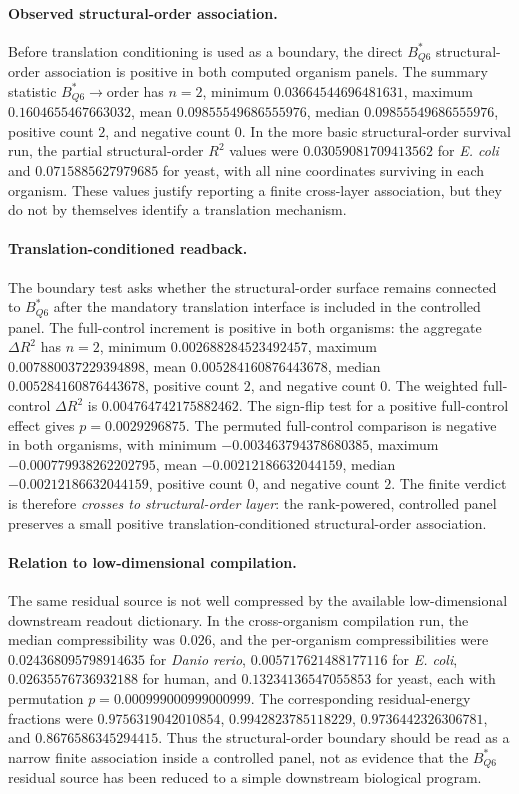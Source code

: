 \paragraph{Observed structural-order association.}
Before translation conditioning is used as a boundary, the direct $B^{\ast}_{Q6}$ structural-order association is positive in both computed organism panels.  The summary statistic $B^{\ast}_{Q6}\to\mathrm{order}$ has $n=2$, minimum $0.03664544696481631$, maximum $0.1604655467663032$, mean $0.09855549686555976$, median $0.09855549686555976$, positive count $2$, and negative count $0$.  In the more basic structural-order survival run, the partial structural-order $R^2$ values were $0.03059081709413562$ for \textit{E. coli} and $0.0715885627979685$ for yeast, with all nine coordinates surviving in each organism.  These values justify reporting a finite cross-layer association, but they do not by themselves identify a translation mechanism.

\paragraph{Translation-conditioned readback.}
The boundary test asks whether the structural-order surface remains connected to $B^{\ast}_{Q6}$ after the mandatory translation interface is included in the controlled panel.  The full-control increment is positive in both organisms: the aggregate $\Delta R^2$ has $n=2$, minimum $0.002688284523492457$, maximum $0.007880037229394898$, mean $0.005284160876443678$, median $0.005284160876443678$, positive count $2$, and negative count $0$.  The weighted full-control $\Delta R^2$ is $0.004764742175882462$.  The sign-flip test for a positive full-control effect gives $p=0.0029296875$.  The permuted full-control comparison is negative in both organisms, with minimum $-0.003463794378680385$, maximum $-0.000779938262202795$, mean $-0.00212186632044159$, median $-0.00212186632044159$, positive count $0$, and negative count $2$.  The finite verdict is therefore \emph{crosses to structural-order layer}: the rank-powered, controlled panel preserves a small positive translation-conditioned structural-order association.

\paragraph{Relation to low-dimensional compilation.}
The same residual source is not well compressed by the available low-dimensional downstream readout dictionary.  In the cross-organism compilation run, the median compressibility was $0.026$, and the per-organism compressibilities were $0.024368095798914635$ for \textit{Danio rerio}, $0.005717621488177116$ for \textit{E. coli}, $0.02635576736932188$ for human, and $0.13234136547055853$ for yeast, each with permutation $p=0.000999000999000999$.  The corresponding residual-energy fractions were $0.9756319042010854$, $0.9942823785118229$, $0.9736442326306781$, and $0.8676586345294415$.  Thus the structural-order boundary should be read as a narrow finite association inside a controlled panel, not as evidence that the $B^{\ast}_{Q6}$ residual source has been reduced to a simple downstream biological program.

